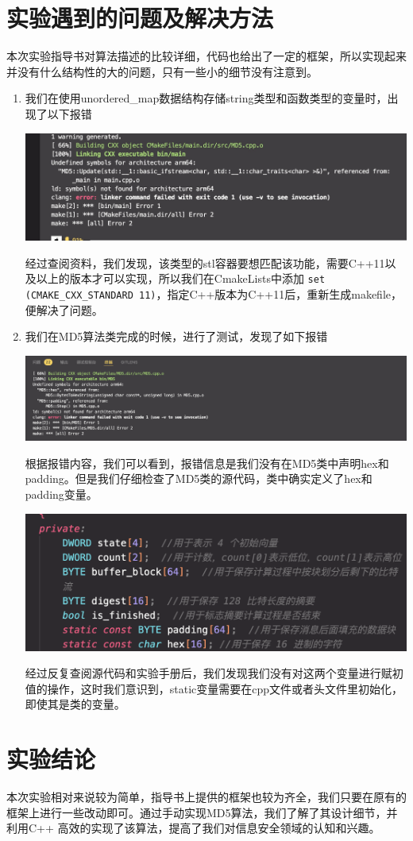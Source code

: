 \documentclass[UTF8,a4paper,10pt]{ctexart}
\begin{document}
\section{实验遇到的问题及解决方法}
本次实验指导书对算法描述的比较详细，代码也给出了一定的框架，所以实现起来并没有什么结构性的大的问题，只有一些小的细节没有注意到。
\begin{enumerate}
    \item 我们在使用unordered\_map数据结构存储string类型和函数类型的变量时，出现了以下报错
    \begin{center}
        \includegraphics*[scale = 0.2]{error}
    \end{center}
    经过查阅资料，我们发现，该类型的stl容器要想匹配该功能，需要C++11以及以上的版本才可以实现，所以我们在CmakeLists中添加 \lstinline{set (CMAKE_CXX_STANDARD 11)}，指定C++版本为C++11后，重新生成makefile，便解决了问题。

    \item 我们在MD5算法类完成的时候，进行了测试，发现了如下报错
    \begin{center}
        \includegraphics*[scale = 0.3]{error1}
    \end{center}
    根据报错内容，我们可以看到，报错信息是我们没有在MD5类中声明hex和padding。但是我们仔细检查了MD5类的源代码，类中确实定义了hex和padding变量。
    \begin{center}
        \includegraphics*[scale = 0.5]{z z}
    \end{center}
    经过反复查阅源代码和实验手册后，我们发现我们没有对这两个变量进行赋初值的操作，这时我们意识到，static变量需要在cpp文件或者头文件里初始化，即使其是类的变量。

\end{enumerate}
\section{实验结论}
本次实验相对来说较为简单，指导书上提供的框架也较为齐全，我们只要在原有的框架上进行一些改动即可。通过手动实现MD5算法，我们了解了其设计细节，并利用C++
高效的实现了该算法，提高了我们对信息安全领域的认知和兴趣。
\end{document}
